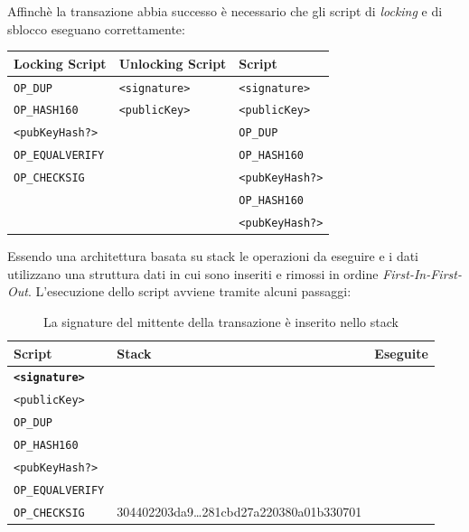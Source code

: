 \begin{enumerate}[1.]
Affinchè la transazione abbia successo è necessario che gli script di \textit{locking} e di sblocco eseguano correttamente:
\begin{table}[H]
    \centering
    \begin{tabular}{l|l|l}
        Locking Script & Unlocking Script & Script\\
        \hline
        \texttt{OP\_DUP}         & \texttt{<signature>} & \texttt{<signature>}\\
        \texttt{OP\_HASH160}     & \texttt{<publicKey>} & \texttt{<publicKey>}\\
        \texttt{<pubKeyHash?>}   &                      & \texttt{OP\_DUP}\\
        \texttt{OP\_EQUALVERIFY} &                      & \texttt{OP\_HASH160}\\
        \texttt{OP\_CHECKSIG}    &                      & \texttt{<pubKeyHash?>}\\
                                 &                      & \texttt{OP\_HASH160}\\
                                 &                      & \texttt{<pubKeyHash?>}\\
    \end{tabular}
\end{table}
Essendo una architettura basata su stack le operazioni da eseguire e i dati utilizzano una struttura dati in cui sono inseriti e rimossi in ordine \textit{First-In-First-Out}.\newline
L'esecuzione dello script avviene tramite alcuni passaggi:
\begin{table}[H]
    \centering
    \begin{tabular}{p{3cm}|p{7.7cm}|p{3cm}}
        Script & Stack & Eseguite\\
        \hline
        \texttt{\textbf{<signature>}} & &\\
        \texttt{<publicKey>}          & &\\
        \texttt{OP\_DUP}              & &\\
        \texttt{OP\_HASH160}          & &\\
        \texttt{<pubKeyHash?>}        & &\\
        \texttt{OP\_EQUALVERIFY}      & &\\
        \texttt{OP\_CHECKSIG}         & 304402203da9\dots281cbd27a220380a01b330701 & \\
    \end{tabular}
    \caption{La signature del mittente della transazione è inserito nello stack}
\end{table}


\end{enumerate}
